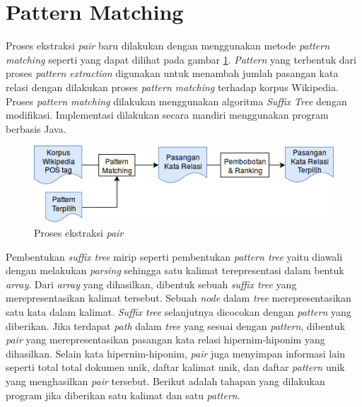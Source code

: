 %
\section{Pattern Matching}
Proses ekstraksi \textit{pair} baru dilakukan dengan menggunakan metode \textit{pattern matching} seperti yang dapat dilihat pada gambar \ref{fig:pattern-matching}. \textit{Pattern} yang terbentuk dari proses \textit{pattern extraction} digunakan untuk menambah jumlah pasangan kata relasi dengan dilakukan proses \textit{pattern matching} terhadap korpus Wikipedia. Proses \textit{pattern matching} dilakukan menggunakan algoritma \textit{Suffix Tree} dengan modifikasi. Implementasi dilakukan secara mandiri menggunakan program berbasis Java.

\begin{figure}
    \centering
    \includegraphics[scale=0.6]{pics/Pic04-PatternMatching}
    \caption{Proses ekstraksi \textit{pair}}
    \label{fig:pattern-matching}
\end{figure}

Pembentukan \textit{suffix tree} mirip seperti pembentukan \textit{pattern tree} yaitu diawali dengan melakukan \textit{parsing} sehingga satu kalimat terepresentasi dalam bentuk \textit{array}. Dari \textit{array} yang dihasilkan, dibentuk sebuah \textit{suffix tree} yang merepresentasikan kalimat tersebut. Sebuah \textit{node} dalam \textit{tree} merepresentasikan satu kata dalam kalimat. \textit{Suffix tree} selanjutnya dicocokan dengan \textit{pattern} yang diberikan. Jika terdapat \textit{path} dalam \textit{tree} yang sesuai dengan \textit{pattern}, dibentuk \textit{pair} yang merepresentasikan pasangan kata relasi hipernim-hiponim yang dihasilkan. Selain kata hipernim-hiponim, \textit{pair} juga menyimpan informasi lain seperti total total dokumen unik, daftar kalimat unik, dan daftar \textit{pattern} unik yang menghasilkan \textit{pair} tersebut. Berikut adalah tahapan yang dilakukan program jika diberikan satu kalimat dan satu \textit{pattern}.

